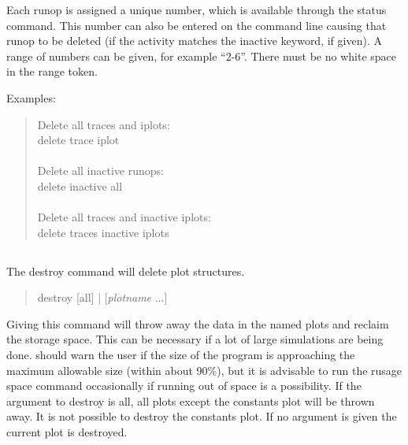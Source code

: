 Each runop is assigned a unique number, which is available through
the {\cb status} command.  This number can also be entered on the
command line causing that runop to be deleted (if the activity
matches the {\vt inactive} keyword, if given).  A range of numbers
can be given, for example ``2-6''.  There must be no white space in
the range token.

Examples:
\begin{quote}
Delete all traces and iplots:\\
{\vt delete trace iplot}\\
\\
Delete all inactive runops:\\
{\vt delete inactive all}\\
\\
Delete all traces and inactive iplots:\\
{\vt delete traces inactive iplots}
\end{quote}

\subsection{}


The {\cb destroy} command will delete plot structures.
\begin{quote}\vt
destroy [all] | [{\it plotname} ...]
\end{quote}
Giving this command will throw away the data in the named plots and
reclaim the storage space.  This can be necessary if a lot of large
simulations are being done.  {\WRspice} should warn the user if the
size of the program is approaching the maximum allowable size (within
about 90\%), but it is advisable to run the {\vt rusage space} command
occasionally if running out of space is a possibility.  If the
argument to {\cb destroy} is {\vt all}, all plots except the constants
plot will be thrown away.  It is not possible to destroy the constants
plot.  If no argument is given the current plot is destroyed.

\subsection{}


